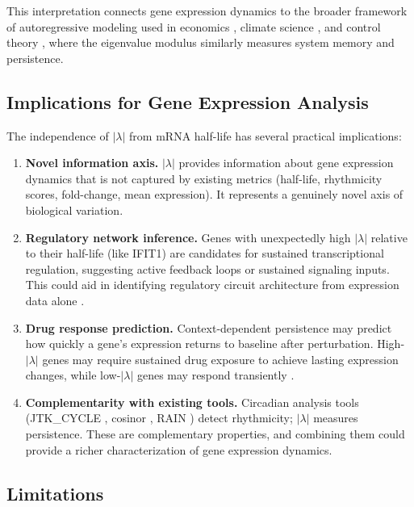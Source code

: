 \documentclass[11pt,letterpaper]{article}
\begin{document}
This interpretation connects gene expression dynamics to the broader framework of autoregressive modeling used in economics \citep{hamilton1994time, sims1980macroeconomics}, climate science \citep{hasselmann1976stochastic}, and control theory \citep{ogata2010modern}, where the eigenvalue modulus similarly measures system memory and persistence.

\subsection{Implications for Gene Expression Analysis}

The independence of $|\lambda|$ from mRNA half-life has several practical implications:

\begin{enumerate}
\item \textbf{Novel information axis.} $|\lambda|$ provides information about gene expression dynamics that is not captured by existing metrics (half-life, rhythmicity scores, fold-change, mean expression). It represents a genuinely novel axis of biological variation.

\item \textbf{Regulatory network inference.} Genes with unexpectedly high $|\lambda|$ relative to their half-life (like IFIT1) are candidates for sustained transcriptional regulation, suggesting active feedback loops or sustained signaling inputs. This could aid in identifying regulatory circuit architecture from expression data alone \citep{alon2007network}.

\item \textbf{Drug response prediction.} Context-dependent persistence may predict how quickly a gene's expression returns to baseline after perturbation. High-$|\lambda|$ genes may require sustained drug exposure to achieve lasting expression changes, while low-$|\lambda|$ genes may respond transiently \citep{dallmann2016chronopharmacology}.

\item \textbf{Complementarity with existing tools.} Circadian analysis tools (JTK\_CYCLE \citep{hughes2010jtk}, cosinor \citep{cornelissen2014cosinor}, RAIN \citep{thaben2014detecting}) detect rhythmicity; $|\lambda|$ measures persistence. These are complementary properties, and combining them could provide a richer characterization of gene expression dynamics.
\end{enumerate}

\subsection{Limitations}
\end{document}
